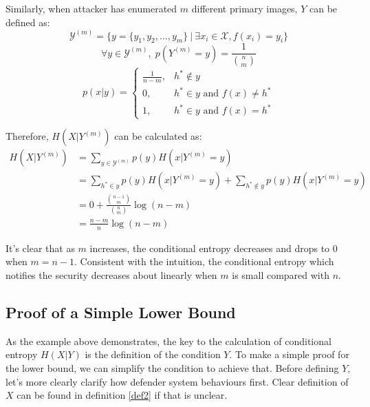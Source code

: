 \documentclass[10pt,a4paper]{article}
\begin{document}
		Similarly, when attacker has enumerated $m$ different primary images, $Y$ can be defined
		as:
		\begin{equation*}
			\mathcal Y^{(m)} = \{ y = \{y_1, y_2, \ldots, y_m\} \: | \: \exists x_i \in \mathcal X, f(x_i) = y_i\}
		\end{equation*}
		\begin{equation*}
			\forall y \in \mathcal Y^{(m)}, \; p(Y^{(m)} = y) = \frac{1}{\binom{n}{m}}
		\end{equation*}
		\begin{equation*}
			p(x|y) = \begin{cases}
				\frac{1}{n-m}, &h^* \notin y\\
				0, &h^* \in y \text{ and } f(x) \neq h^*\\
				1, &h^* \in y \text{ and } f(x) = h^*
			\end{cases}
		\end{equation*}
		
		Therefore, $H(X | Y^{(m)})$ can be calculated as:
		\begin{align*}
			H(X | Y^{(m)}) &= \sum_{y \in \mathcal Y^{(m)}} p(y) H(x | Y^{(m)} = y)\\
				&= \sum_{h^* \in y} p(y) H(x | Y^{(m)} = y) + \sum_{h^* \notin y} p(y) H(x | Y^{(m)} = y)\\
				&= 0+\frac{\binom{n-1}{m}}{\binom{n}{m}} \log(n-m)\\
				&= \frac{n-m}{n} \log(n-m)
		\end{align*}
		
		It's clear that as $m$ increases, 
		the conditional entropy decreases and drops to $0$ when $m = n-1$. 
		Consistent with the intuition, the conditional
		entropy which notifies the security decreases about linearly when $m$ is small 
		compared with $n$.
		
	\subsection{Proof of a Simple Lower Bound}
		As the example above demonstrates, the key to the calculation
		of conditional entropy $H(X|Y)$ is the definition of the condition $Y$.
		To make a simple proof for the lower bound, we can simplify the
		condition to achieve that. Before defining $Y$, let's
		more clearly clarify how defender system behaviours first. Clear
		definition of $X$ can be found in definition \ref{def2}
		if that is unclear.
		
\end{document}
